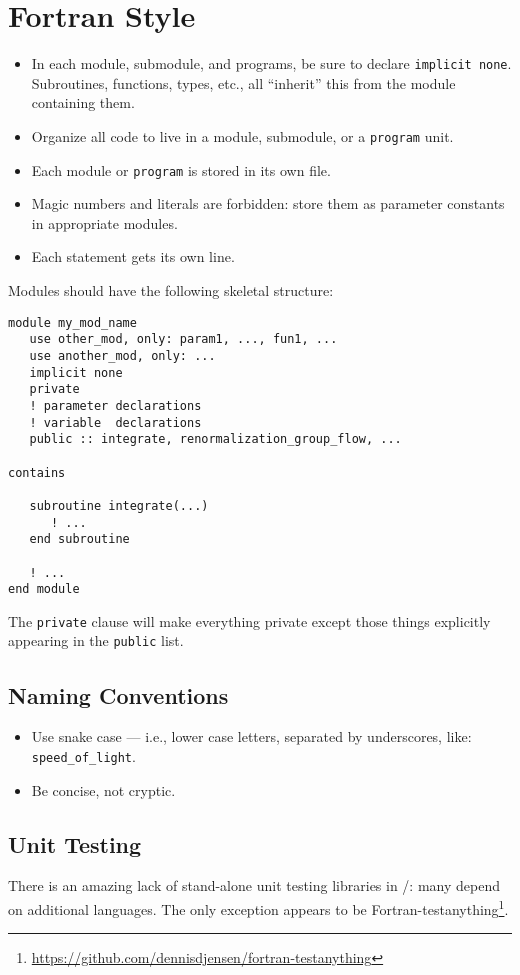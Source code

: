 \chapter{Fortran Style}

\begin{itemize}
\item In each module, submodule, and programs, be sure to declare
  \verb|implicit none|. Subroutines, functions, types, etc., all
  ``inherit'' this from the module containing them.
\item Organize all code to live in a module, submodule, or a
  \verb|program| unit.
\item Each module or \verb|program| is stored in its own file.
\item Magic numbers and literals are forbidden: store them as parameter
  constants in appropriate modules.
\item Each statement gets its own line.
\end{itemize}

Modules should have the following skeletal structure:
\begin{verbatim}
module my_mod_name
   use other_mod, only: param1, ..., fun1, ...
   use another_mod, only: ...
   implicit none
   private
   ! parameter declarations
   ! variable  declarations
   public :: integrate, renormalization_group_flow, ...

contains

   subroutine integrate(...)
      ! ...
   end subroutine

   ! ...
end module
\end{verbatim}
The \verb|private| clause will make everything private except those
things explicitly appearing in the \verb|public| list.

\section{Naming Conventions}

\begin{itemize}
\item Use snake case --- i.e., lower case letters, separated by
  underscores, like: \verb|speed_of_light|.
\item Be concise, not cryptic.
\end{itemize}

\section{Unit Testing}

There is an amazing lack of stand-alone unit testing libraries in
\FORTRAN/: many depend on additional languages. The only exception
appears to be Fortran-testanything\footnote{\url{https://github.com/dennisdjensen/fortran-testanything}}.


